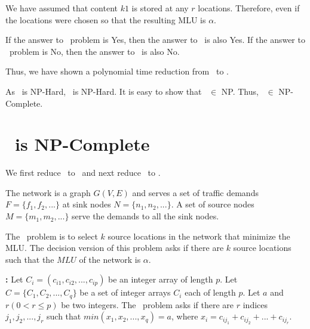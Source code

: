 {We have assumed that content $k1$ is stored at any $r$ locations. Therefore, even if the locations were chosen so that the resulting MLU is $\alpha$.




If the answer to \optloc\ problem is Yes, then the answer to  \minsubsetsum\ is also Yes. If the answer to \optloc\ problem is No, then the answer to  \minsubsetsum\ is also No. 

Thus, we have shown a polynomial time reduction from \minsubsetsum\ to \optloc.




As \subsetsum\ is NP-Hard, \optloc\ is NP-Hard. It is easy to show that \optloc\ $\in$ NP. Thus, \optloc\ $\in$ NP-Complete.


\section{\optloc\ is NP-Complete}
\label{sec:npcreduction}


We first reduce \subsetsum\ to \minsubsetsum\ and next reduce \minsubsetsum\ to \optloc. 

  The network is a graph $G(V, E)$ and  serves a set of traffic demands $F=\{f_1,f_2, ...\}$ at sink nodes $N = \{n_1, n_2, ...\}$. A set of source nodes $M =\{m_1, m_2, ...\}$ serve the demands to all the sink nodes.

\vsp
\noindent{\bf{\optloc:}} The \optloc\ problem is to select $k$ source locations in the network that minimize the MLU. The decision version of this problem asks if there are $k$ source locations such that the $MLU$ of the network is $\alpha$. 





\vsp
\noindent\textbf{\minsubsetsum:} Let $C_i = (c_{i1}, c_{i2}, ..., c_{ip})$ be an integer array of length $p$. Let $C = \{C_1, C_2, ..., C_q\}$ be a set of integer arrays $C_i$ each of length $p$. Let $a$ and $r (0 < r \leq p)$  be two integers. The \minsubsetsum\ problem asks if there are $r$ indices $j_1, j_2, ..., j_r$ such that $ \textit{min}(x_1, x_2, ... , x_q) = a$, where $x_i = c_{ij_1} + c_{ij_2} + ... + c_{ij_r}$.

}

